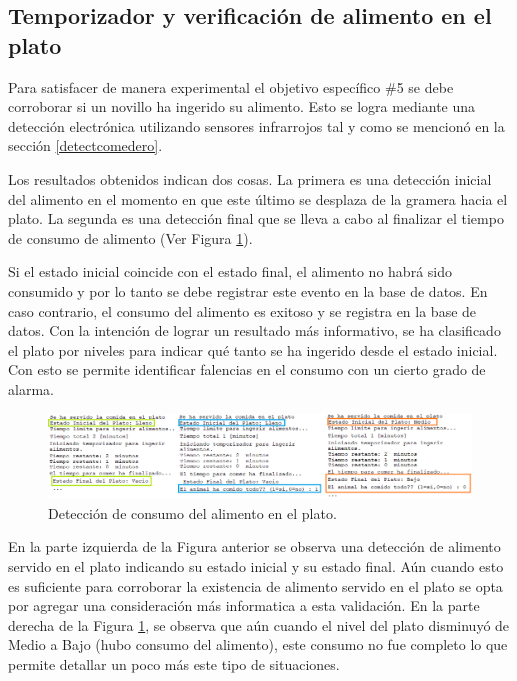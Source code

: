 \subsection{Temporizador y verificación de alimento en el plato}

Para satisfacer de manera experimental el objetivo específico \#5 se debe corroborar si un novillo ha ingerido su alimento. Esto se logra mediante una detección electrónica utilizando sensores infrarrojos tal y como se mencionó en la sección \ref{detectcomedero}. 

Los resultados obtenidos indican dos cosas. La primera es una detección inicial del alimento en el momento en que este último se desplaza de la gramera hacia el plato. La segunda es una detección final que se lleva a cabo al finalizar el tiempo de consumo de alimento (Ver Figura \ref{comidaplatopng}).

Si el estado inicial coincide con el estado final, el alimento no habrá sido consumido y por lo tanto se debe registrar este evento en la base de datos. En caso contrario, el consumo del alimento es exitoso y se registra en la base de datos. Con la intención de lograr un resultado más informativo, se ha clasificado el plato por niveles para indicar qué tanto se ha ingerido desde el estado inicial. Con esto se permite identificar falencias en el consumo con un cierto grado de alarma.

\begin{figure}[H]
	\begin{center}
		\includegraphics[scale=0.54]{img/comidaplato.png}
	\end{center}
	\caption{Detección de consumo del alimento en el plato.}\label{comidaplatopng}
\end{figure}

 En la parte izquierda de la Figura anterior se observa una detección de alimento servido en el plato indicando su estado inicial y su estado final. Aún cuando esto es suficiente para corroborar la existencia de alimento servido en el plato se opta por agregar una consideración más informatica a esta validación. En la parte derecha de la Figura \ref{comidaplatopng}, se observa que aún cuando el nivel del plato disminuyó de Medio a Bajo (hubo consumo del alimento), este consumo no fue completo lo que permite detallar un poco más este tipo de situaciones.

